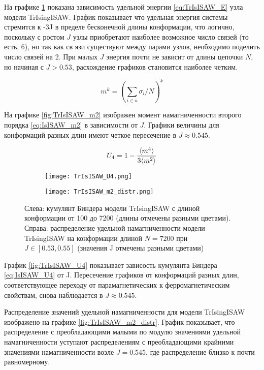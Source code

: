 На графике \ref{fig:TrIsISAW_E} показана зависимость удельной энергии \eqref{eq:TrIsISAW_E} узла модели TrIsingISAW.
График показывает что удельная энергия системы стремится к -3J в пределе бесконечной длины конформации, 
что логично, поскольку с ростом $J$ узлы приобретают наиболее возможное число связей (то есть, 6), но так как св
язи существуют между парами узлов,
необходимо поделить число связей на 2.
При малых $J$ энергия почти не зависит от длины цепочки $N$, но начиная с $J > 0.53$, расхождение графиков становится наиболее четким.

\begin{equation}
\label{eq:IsISAW_m2}
	m^{k} = (\sum_{i \in u} \sigma_i / N)^k
\end{equation}

На графике \ref{fig:TrIsISAW_m2} изображен момент намагниченности второго порядка \eqref{eq:IsISAW_m2} в зависимости от $J$.
Графики величины для конформаций разных длин имеют четкое пересечение в $J \approx 0.545$.

\begin{equation}
\label{eq:IsISAW_U4}
	U_4 = 1 - \frac{\langle m^4 \rangle}{3 \langle m^2 \rangle}
\end{equation}

\begin{figure}[h]
\begin{subfigure}{0.49\textwidth}
\texttt{[image: TrIsISAW\_U4.png]}
\end{subfigure}
\hfill
\begin{subfigure}{0.49\textwidth}
\texttt{[image: TrIsISAW\_m2\_distr.png]}
\end{subfigure}
\caption{Слева: кумулянт Биндера модели TrIsingISAW с длиной конформации от 100 до 7200 (длины отмечены разными цветами).
Справа: распределение удельной намагниченности модели TrIsingISAW на конформации длиной $N=7200$ при $J \in [0.53,0.55]$ (значения J отмечены разными цветами)}
\label{fig:TrIsISAW_E}
\end{figure}


График \ref{fig:TrIsISAW_U4} показывает зависость кумулянта Биндера \eqref{eq:IsISAW_U4} от J. 
Пересечение графиков от конформаций разных длин, соответствующее переходу от парамагнетических к ферромагнетическим свойствам, снова наблюдается в $J \approx 0.545$.

Распределение значений удельной намагниченности для модели TrIsingISAW изображено на графике \ref{fig:TrIsISAW_m2_distr}.
График показывает, что распределение с преобладающими малыми по модулю значениями удельной намагниченности уступают 
распределениям с преобладающими крайними значениями намагниченности возле $J=0.545$, где распределение близко к почти равномерному.

